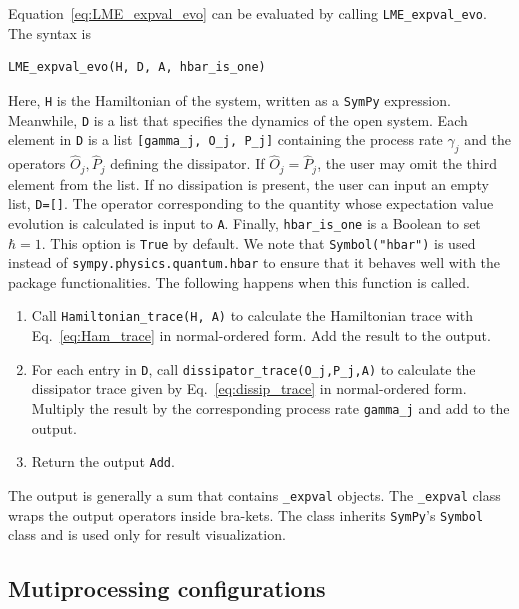 \documentclass[5p, twocolumn, 10pt, sort&compress]{elsarticle}
\newcommand{\inlinecode}[1]{\texttt{#1}}
\begin{document}
Equation~\eqref{eq:LME_expval_evo} can be evaluated by calling \inlinecode{LME_expval_evo}. The syntax is
\begin{verbatim}
LME_expval_evo(H, D, A, hbar_is_one)
\end{verbatim}
Here, \inlinecode{H} is the Hamiltonian of the system, written as a \texttt{SymPy} expression. Meanwhile, \inlinecode{D} is a list that specifies the dynamics of the open system.  Each element in \inlinecode{D} is a list \inlinecode{[gamma_j, O_j, P_j]} containing the process rate $\gamma_j$ and the operators $\hat{O}_j,\hat{P}_j$ defining the dissipator. If $\hat{O}_j=\hat{P}_j$, the user may omit the third element from the list. If no dissipation is present, the user can input an empty list, \inlinecode{D=[]}. The operator corresponding to the quantity whose expectation value evolution is calculated is input to \inlinecode{A}. Finally, \inlinecode{hbar_is_one} is a Boolean to set $\hbar=1$. This option is \inlinecode{True} by default. We note that \inlinecode{Symbol("hbar")} is used instead of \inlinecode{sympy.physics.quantum.hbar} to ensure that it behaves well with the package functionalities. The following happens when this function is called.
\begin{enumerate}
    \item Call \inlinecode{Hamiltonian_trace(H, A)} to calculate the Hamiltonian trace with Eq.~\eqref{eq:Ham_trace} in normal-ordered form. Add the result to the output.
    \item For each entry in \inlinecode{D}, call \inlinecode{dissipator_trace(O_j,P_j,A)} to calculate the dissipator trace given by Eq.~\eqref{eq:dissip_trace} in normal-ordered form. Multiply the result by the corresponding process rate \inlinecode{gamma_j} and add to the output.
    \item Return the output \inlinecode{Add}. 
\end{enumerate}
The output is generally a sum that contains \inlinecode{_expval} objects. The \inlinecode{_expval} class wraps the output operators inside bra-kets. The class inherits \texttt{SymPy}'s \inlinecode{Symbol} class and is used only for result visualization. 


\subsection{Mutiprocessing configurations}
\end{document}
